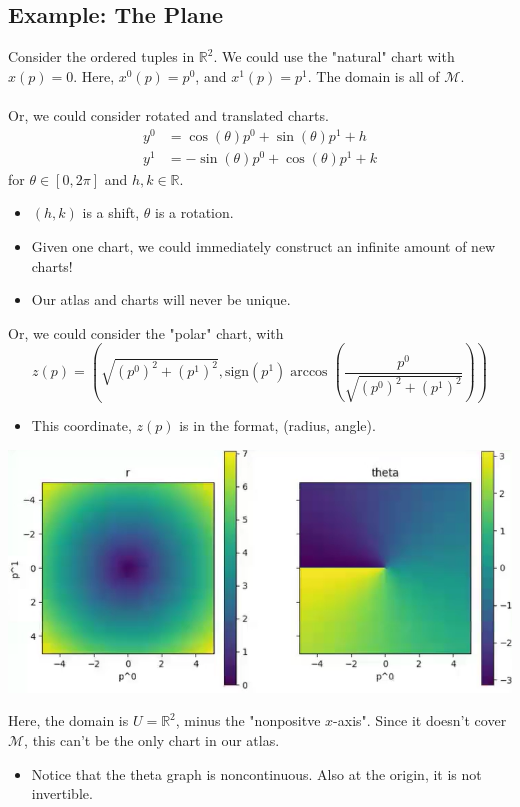 \documentclass[10pt]{article}
\newcommand{\R}{\mathbb{R}}
\begin{document}
\subsection*{Example: The Plane}
Consider the ordered tuples in $\mathbb{R}^2$.  We could use the "natural" chart with $x(p) = 0$.  Here, $x^0(p) = p^0$, and $x^1(p) = p^1$.  The domain is all of $\mathcal{M}$.\\\\
Or, we could consider rotated and translated charts.
\begin{align*}
    y^0 &= \cos(\theta) p^0 + \sin(\theta) p^1 + h\\
    y^1 &= -\sin(\theta) p^0 + \cos(\theta) p^1 + k
\end{align*}
for $\theta \in [0, 2\pi]$ and $h, k \in \R$.
\begin{itemize}
    \item $(h, k)$ is a shift, $\theta$ is a rotation.
    \item Given one chart, we could immediately construct an infinite amount of new charts!
    \item Our atlas and charts will never be unique.
\end{itemize}
Or, we could consider the "polar" chart, with
\[z(p) = \left(\sqrt{(p^0)^2 + (p^1)^2}, \text{sign}(p^1) \arccos\left(\frac{p^0}{\sqrt{(p^0)^2 + (p^1)^2}}\right)\right)\]
\begin{itemize}
    \item This coordinate, $z(p)$ is in the format, (radius, angle).
\end{itemize}
\begin{center}
    \includegraphics*[scale=0.9]{W4_3.png}
\end{center}
Here, the domain is $U = \mathbb{R}^2$, minus the "nonpositve $x$-axis".  Since it doesn't cover $\mathcal{M}$, this can't be the only chart in our atlas.
\begin{itemize}
    \item Notice that the theta graph is noncontinuous.  Also at the origin, it is not invertible.
\end{itemize}
\end{document}
